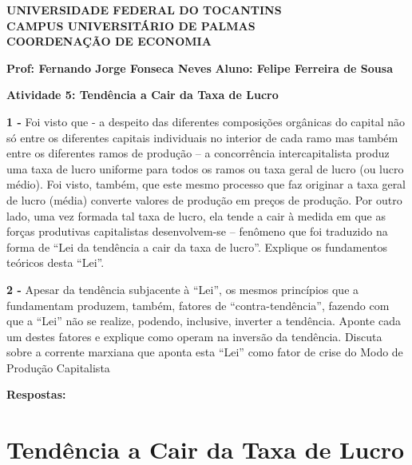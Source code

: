 \documentclass[a4paper, 12pt]{article} %
\begin{document}
\begin{center}
\textbf{UNIVERSIDADE FEDERAL DO TOCANTINS\\
	CAMPUS UNIVERSITÁRIO DE PALMAS\\
	COORDENAÇÃO DE ECONOMIA}
\end{center}

\textbf{Prof: Fernando Jorge Fonseca Neves }
\singlespacing
\textbf{Aluno: Felipe Ferreira de Sousa}
\begin{center}
\textbf{Atividade 5: Tendência a Cair da Taxa de Lucro}
\end{center}
\vspace{0.5cm}

\par \textbf{1 - } Foi visto que - a despeito das diferentes composições orgânicas do capital não só entre os
diferentes capitais individuais no interior de cada ramo mas também entre os diferentes ramos
de produção – a concorrência intercapitalista produz uma taxa de lucro uniforme para todos
os ramos ou taxa geral de lucro (ou lucro médio). Foi visto, também, que este mesmo processo
que faz originar a taxa geral de lucro (média) converte valores de produção em preços de
produção.
Por outro lado, uma vez formada tal taxa de lucro, ela tende a cair à medida em que as forças
produtivas capitalistas desenvolvem-se – fenômeno que foi traduzido na forma de “Lei da
tendência a cair da taxa de lucro”. Explique os fundamentos teóricos desta “Lei”.

\vspace{0.5cm}

\par \textbf{2 -} Apesar da tendência subjacente à “Lei”, os mesmos princípios que a fundamentam
produzem, também, fatores de “contra-tendência”, fazendo com que a “Lei” não se realize,
podendo, inclusive, inverter a tendência. Aponte cada um destes fatores e explique como
operam na inversão da tendência. Discuta sobre a corrente marxiana que aponta esta “Lei”
como fator de crise do Modo de Produção Capitalista

\vspace{0.5cm}

\begin{center}
\textbf{Respostas:}
\end{center}

\section{Tendência a Cair da Taxa de Lucro}
\end{document}
